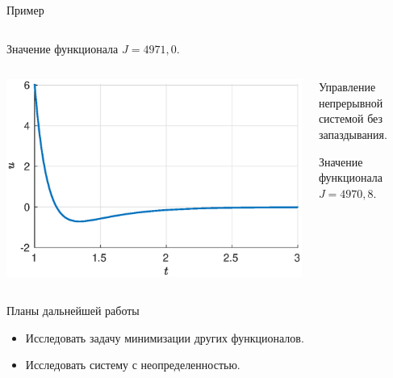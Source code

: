 \begin{frame}{Пример}
\begin{columns}
\begin{column}{0.55\textwidth}
                                Значение функционала $J = 4971,\!0$.
                        \end{column}
                \end{columns}
                \begin{columns}
                        \begin{column}{0.45\textwidth}
                                \includegraphics[width=1.15\textwidth]{content/example/simple-control.eps}
                        \end{column}
                        \begin{column}{0.55\textwidth}
                                Управление непрерывной системой без запаздывания.

                                \vspace{0.2cm}

                                Значение функционала $J = 4970,\!8$.
                        \end{column}
                \end{columns}
        \end{frame}
        \begin{frame}{Планы дальнейшей работы}
                \begin{itemize}
                        \item Исследовать задачу минимизации других функционалов.
                        \item Исследовать систему с неопределенностью.
                \end{itemize}
        \end{frame}
